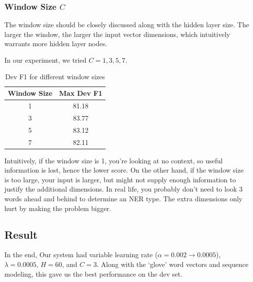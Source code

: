 \documentclass[12pt, twocolumn]{article}
\begin{document}
\subsubsection{Window Size $C$}
The window size should be closely discussed along with the hidden layer size. The larger the window, the larger the input vector dimensions, which intuitively warrants more hidden layer nodes.

In our experiment, we tried $C=1,3,5,7$.
\begin{table}[H]
\centering
	\begin{tabular}{|c|c|}
		\hline
		Window Size & Max Dev F1 \\\hline
		1 & 81.18 \\\hline
		3 & 83.77 \\\hline
		5 & 83.12 \\\hline
		7 & 82.11 \\\hline
	\end{tabular}
	\caption{Dev F1 for different window sizes}
\label{tab:window}
\end{table}
Intuitively, if the window size is 1, you're looking at no context, so useful information is lost, hence the lower score. On the other hand, if the window size is too large, your input is larger, but might not supply enough information to justify the additional dimensions. In real life, you probably don't need to look 3 words ahead and behind to determine an NER type. The extra dimensions only hurt by making the problem bigger.

\subsection{Result}
In the end, Our system had variable learning rate ($\alpha = 0.002\rightarrow0.0005$), $\lambda = 0.0005$, $H=60$, and $C=3$. Along with the `glove' word vectors and sequence modeling, this gave us the best performance on the dev set.
\end{document}
